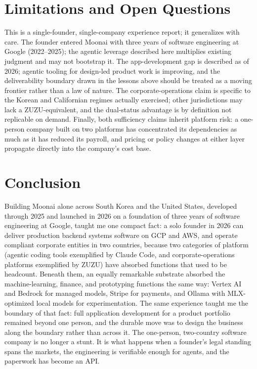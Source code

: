 \documentclass{article}
\begin{document}
\section{Limitations and Open Questions}

This is a single-founder, single-company experience report; it generalizes with care. The founder entered Moonai with three years of software engineering at Google (2022--2025); the agentic leverage described here multiplies existing judgment and may not bootstrap it. The app-development gap is described as of 2026; agentic tooling for design-led product work is improving, and the deliverability boundary drawn in the lessons above should be treated as a moving frontier rather than a law of nature. The corporate-operations claim is specific to the Korean and Californian regimes actually exercised; other jurisdictions may lack a ZUZU-equivalent, and the dual-status advantage is by definition not replicable on demand. Finally, both sufficiency claims inherit platform risk: a one-person company built on two platforms has concentrated its dependencies as much as it has reduced its payroll, and pricing or policy changes at either layer propagate directly into the company's cost base.

\section{Conclusion}

Building Moonai alone across South Korea and the United States, developed through 2025 and launched in 2026 on a foundation of three years of software engineering at Google, taught me one compact fact: a solo founder in 2026 can deliver production backend systems software on GCP and AWS, and operate compliant corporate entities in two countries, because two categories of platform (agentic coding tools exemplified by Claude Code, and corporate-operations platforms exemplified by ZUZU) have absorbed functions that used to be headcount. Beneath them, an equally remarkable substrate absorbed the machine-learning, finance, and prototyping functions the same way: Vertex AI and Bedrock for managed models, Stripe for payments, and Ollama with MLX-optimized local models for experimentation. The same experience taught me the boundary of that fact: full application development for a product portfolio remained beyond one person, and the durable move was to design the business along the boundary rather than across it. The one-person, two-country software company is no longer a stunt. It is what happens when a founder's legal standing spans the markets, the engineering is verifiable enough for agents, and the paperwork has become an API.
\end{document}
